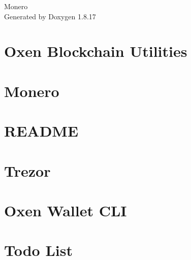 \let\mypdfximage\pdfximage\def\pdfximage{\immediate\mypdfximage}\documentclass[twoside]{book}
\newcommand{\+}{\discretionary{\mbox{\scriptsize$\hookleftarrow$}}{}{}}
\newcommand{\clearemptydoublepage}{%
  \newpage{\pagestyle{empty}\cleardoublepage}%
}
\begin{document}
\hypersetup{pageanchor=false,
             bookmarksnumbered=true,
             pdfencoding=unicode
            }
\begin{titlepage}
\vspace*{7cm}
\begin{center}%
{\Large Monero }\\
\vspace*{1cm}
{\large Generated by Doxygen 1.8.17}\\
\end{center}
\end{titlepage}
\clearemptydoublepage
{}
\tableofcontents
\clearemptydoublepage
{}
\hypersetup{pageanchor=true}

\chapter{Oxen Blockchain Utilities}
\label{md_src_blockchain_utilities_README}

\chapter{Monero}
\label{md_src_crypto_crypto_ops_builder_README}

\chapter{R\+E\+A\+D\+ME}
\label{md_src_crypto_crypto_ops_builder_ref10_README}

\chapter{Trezor}
\label{md_src_device_trezor_trezor_tools_README}

\chapter{Oxen Wallet C\+LI}
\label{md_src_wallet3_cli-wallet_README}

\chapter{Todo List}
\label{todo}

\end{document}
